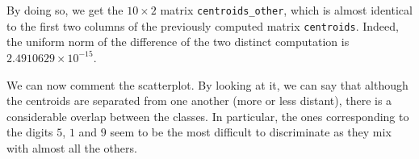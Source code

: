\documentclass[
]{article}
\newenvironment{Shaded}{\begin{snugshade}}{\end{snugshade}}
\newcommand{\AttributeTok}[1]{\textcolor[rgb]{0.13,0.29,0.53}{#1}}
\newcommand{\ControlFlowTok}[1]{\textcolor[rgb]{0.13,0.29,0.53}{\textbf{#1}}}
\newcommand{\DecValTok}[1]{\textcolor[rgb]{0.00,0.00,0.81}{#1}}
\newcommand{\FunctionTok}[1]{\textcolor[rgb]{0.13,0.29,0.53}{\textbf{#1}}}
\newcommand{\NormalTok}[1]{#1}
\newcommand{\OtherTok}[1]{\textcolor[rgb]{0.56,0.35,0.01}{#1}}
\newcommand{\SpecialCharTok}[1]{\textcolor[rgb]{0.81,0.36,0.00}{\textbf{#1}}}
\newcommand{\StringTok}[1]{\textcolor[rgb]{0.31,0.60,0.02}{#1}}
\theoremstyle{plain}
\begin{document}
\smallskip

\begin{Shaded}
\end{Shaded}

By doing so, we get the \(10 \times 2\) matrix
\texttt{centroids\_other}, which is almost identical to the first two
columns of the previously computed matrix \texttt{centroids}. Indeed,
the uniform norm of the difference of the two distinct computation is
\(\ensuremath{2.4910629\times 10^{-15}}\).

We can now comment the scatterplot. By looking at it, we can say that
although the centroids are separated from one another (more or less
distant), there is a considerable overlap between the classes. In
particular, the ones corresponding to the digits \(5\), \(1\) and \(9\)
seem to be the most difficult to discriminate as they mix with almost
all the others.
\end{document}
